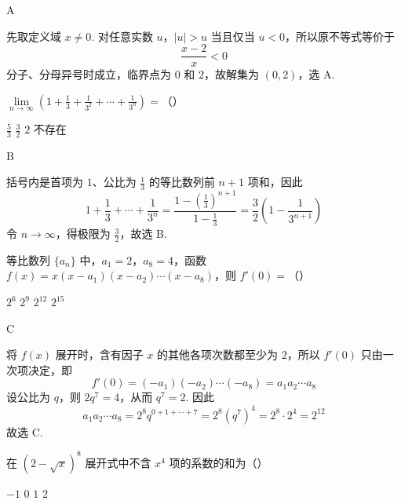 \begin{answer}
A
\end{answer}

\begin{solution}
先取定义域 \(x\neq0\). 对任意实数 \(u\)，\(|u|>u\) 当且仅当 \(u<0\)，所以原不等式等价于
\[
\frac{x-2}{x}<0
\]
分子、分母异号时成立，临界点为 \(0\) 和 \(2\)，故解集为 \((0,2)\)，选 A.
\end{solution}

\begin{problem}
\(\displaystyle \lim\limits_{n\to\infty}\left(1 + \frac{1}{3} + \frac{1}{3^2} + \cdots + \frac{1}{3^n}\right) =\)（\quad）

\choices
    {\(\frac{5}{3}\)}
    {\(\frac{3}{2}\)}
    {\(2\)}
    {不存在}
\end{problem}

\begin{answer}
B
\end{answer}

\begin{solution}
括号内是首项为 \(1\)、公比为 \(\frac13\) 的等比数列前 \(n+1\) 项和，因此
\[
1+\frac13+\cdots+\frac1{3^n}
=\frac{1-\left(\frac13\right)^{n+1}}{1-\frac13}
=\frac32\left(1-\frac1{3^{n+1}}\right)
\]
令 \(n\to\infty\)，得极限为 \(\frac32\)，故选 B.
\end{solution}

\begin{problem}
等比数列 \(\{a_n\}\) 中，\(a_1 = 2\)，\(a_8 = 4\)，函数 \(f(x) = x(x-a_1)(x-a_2)\cdots(x-a_8)\)，则 \(f'(0) =\)（\quad）

\choices
    {\(2^6\)}
    {\(2^9\)}
    {\(2^{12}\)}
    {\(2^{15}\)}
\end{problem}

\begin{answer}
C
\end{answer}

\begin{solution}
将 \(f(x)\) 展开时，含有因子 \(x\) 的其他各项次数都至少为 \(2\)，所以 \(f'(0)\) 只由一次项决定，即
\[
f'(0)=(-a_1)(-a_2)\cdots(-a_8)=a_1a_2\cdots a_8
\]
设公比为 \(q\)，则 \(2q^7=4\)，从而 \(q^7=2\). 因此
\[
a_1a_2\cdots a_8
=2^8q^{0+1+\cdots+7}
=2^8(q^7)^4
=2^8\cdot2^4=2^{12}
\]
故选 C.
\end{solution}

\begin{problem}
在 \((2-\sqrt{x})^8\) 展开式中不含 \(x^4\) 项的系数的和为（\quad）

\choices
    {\(-1\)}
    {\(0\)}
    {\(1\)}
    {\(2\)}
\end{problem}

